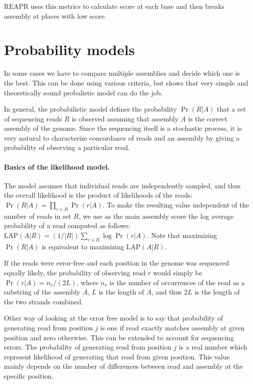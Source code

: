 REAPR uses this metrics to calculate score at each base and then breaks assembly at places with low score.

\section{Probability models}

In some cases we have to compare multiple assemblies and decide which one is
the best. This can be done using various criteria, but \cite{Ghodsi2013} shows
that very simple and theoretically sound probalistic model can do the job.

In general, the probabilistic model defines the probability $\Pr(R|A)$ that a set of
sequencing reads $R$ is observed assuming that assembly $A$ is the
correct assembly of the genome. Since the sequencing itself is a
stochastic process, it is very natural to characterize concordance of
reads and an assembly by giving a probability of observing a particular
read.

\def\LAP{\mathrm{LAP}}

\paragraph{Basics of the likelihood model.}
The model assumes
that individual reads are independently sampled, and thus the overall
likelihood is the product of likelihoods of the reads:
$\Pr(R|A) = \prod_{r\in R} \Pr(r|A).$
To make
the resulting value independent of the number of reads in set 
$R$, we use as the main
assembly score the log average probability of a read computed as
follows: $\LAP(A|R) = (1/|R|)\sum_{r\in R} \log \Pr(r|A).$ Note that
maximizing $\Pr(R|A)$ is equivalent to maximizing $\LAP(A|R)$.

If the reads were error-free and each position in the genome was
sequenced equally likely, the probability of observing read $r$
would simply be $\Pr(r|A)=n_r/(2L)$, where $n_r$ is the number of 
occurrences of the read as a substring of the assembly $A$,
$L$ is the length of $A$, and thus $2L$ is the length of the two
strands combined.

Other way of looking at the error free model is to say that probability
of generating read from position $j$ is one if read exactly matches 
assembly at given position and zero otherwise. This can be extended
to account for sequencing errors. The probability of generating read
from position $j$ is a real number which represent likelihood of generating
that read from given position. This value mainly depends on the number
of differences between read and assembly at the specific position.

